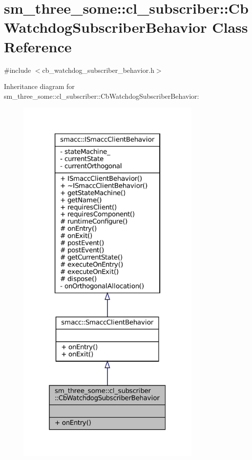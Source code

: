 \hypertarget{classsm__three__some_1_1cl__subscriber_1_1CbWatchdogSubscriberBehavior}{}\section{sm\+\_\+three\+\_\+some\+:\+:cl\+\_\+subscriber\+:\+:Cb\+Watchdog\+Subscriber\+Behavior Class Reference}
\label{classsm__three__some_1_1cl__subscriber_1_1CbWatchdogSubscriberBehavior}


{\ttfamily \#include $<$cb\+\_\+watchdog\+\_\+subscriber\+\_\+behavior.\+h$>$}



Inheritance diagram for sm\+\_\+three\+\_\+some\+:\+:cl\+\_\+subscriber\+:\+:Cb\+Watchdog\+Subscriber\+Behavior\+:
\nopagebreak
\begin{figure}[H]
\begin{center}
\leavevmode
\includegraphics[width=258pt]{classsm__three__some_1_1cl__subscriber_1_1CbWatchdogSubscriberBehavior__inherit__graph}
\end{center}
\end{figure}


